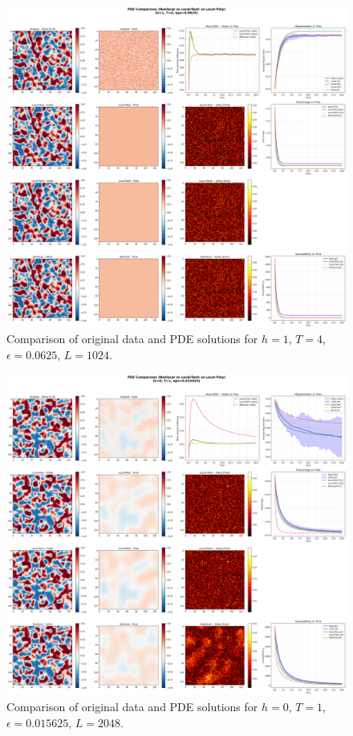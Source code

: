 \documentclass[11pt,a4paper]{article}
\begin{document}
\begin{figure}[!h]
    \centering
    \includegraphics[width=1.0\textwidth]{fig/compare_pde_solvers_L1024_h1_T4_eps0.0625.png}
    \caption{Comparison of original data and PDE solutions for $h=1$, $T=4$, $\epsilon=0.0625$, $L=1024$.}
    \label{fig:pde_comparison_h1_T4_eps0.0625}
\end{figure}



\begin{figure}[!h]
    \centering
    \includegraphics[width=1.0\textwidth]{fig/compare_pde_solvers_L2048_h0_T1_eps0.015625.png}
    \caption{Comparison of original data and PDE solutions for $h=0$, $T=1$, $\epsilon=0.015625$, $L=2048$.}
    \label{fig:pde_comparison_h0_T1_eps0.015625_L2048}
\end{figure}
\end{document}
